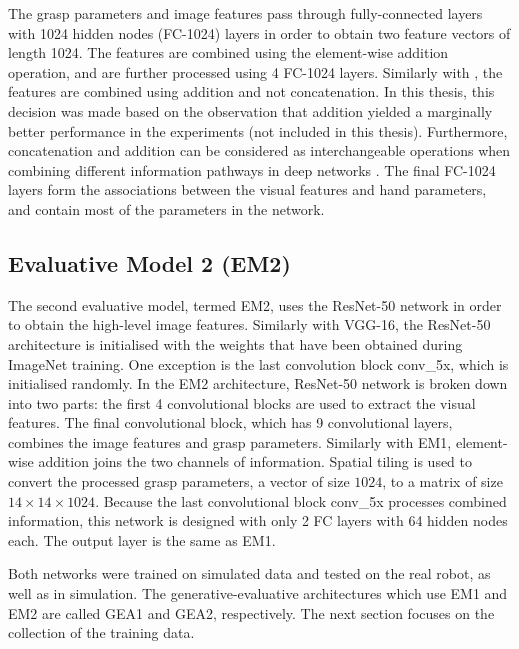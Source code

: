 The grasp parameters and image features pass through fully-connected layers with 1024 hidden nodes (FC-1024) layers in order to obtain two feature vectors of length 1024. The features are combined using the element-wise addition operation, and are further processed using 4 FC-1024 layers. Similarly with \cite{Levine1}, the features are combined using addition and not concatenation. In this thesis, this decision was made based on the observation that addition yielded a marginally better performance in the experiments (not included in this thesis). Furthermore, concatenation and addition can be considered as interchangeable operations when combining different information pathways in deep networks \cite{dumoulin2018feature-wise}. The final FC-1024 layers form the associations between the visual features and hand parameters, and contain most of the parameters in the network. 

\subsection{Evaluative Model 2 (EM2)}


The second evaluative model, termed EM2, uses the ResNet-50 network in order to obtain the high-level image features. Similarly with VGG-16, the ResNet-50 architecture is initialised with the weights that have been obtained during ImageNet training. One exception is the last convolution block conv\_5x, which is initialised randomly. In the EM2 architecture, ResNet-50 network is broken down into two parts: the first 4 convolutional blocks are used to extract the visual features. The final convolutional block, which has 9 convolutional layers, combines the image features and grasp parameters. Similarly with EM1, element-wise addition joins the two channels of information. Spatial tiling is used to convert the processed grasp parameters, a vector of size $1024$, to a matrix of size $14 \times 14 \times 1024$. Because the last convolutional block conv\_5x processes combined information, this network is designed with only 2 FC layers with 64 hidden nodes each. The output layer is the same as EM1. 

Both networks were trained on simulated data and tested on the real robot, as well as in simulation. The generative-evaluative architectures which use EM1 and EM2 are called GEA1 and GEA2, respectively. The next section focuses on the collection of the training data.